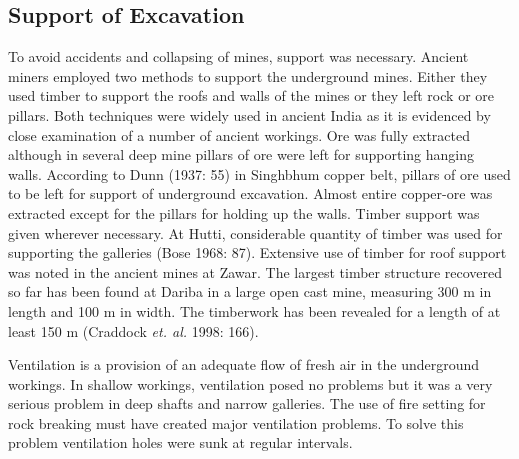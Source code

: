 \vspace{-.3cm}

\subsection*{Support of Excavation}

\vspace{-.2cm}

To avoid accidents and collapsing of mines, support was necessary. Ancient miners employed two methods to support the underground mines. Either they used timber to support the roofs and walls of the mines or they left rock or ore pillars. Both techniques were widely used in ancient India as it is evidenced by close examination of a number of ancient workings.  Ore was fully extracted although in several deep mine pillars of ore were left for supporting hanging walls. According to Dunn (1937: 55) in Singhbhum copper belt, pillars of ore used to be left for support of underground excavation. Almost entire copper-ore was extracted except for the pillars for holding up the walls. Timber support was given wherever necessary.  At Hutti, considerable quantity of timber was used for supporting the galleries (Bose 1968: 87).  Extensive use of timber for roof support was noted in the ancient mines at Zawar. The largest timber structure recovered so far has been found at Dariba in a large open cast mine, measuring 300 m in length and 100 m in width. The timberwork has been revealed for a length of at least 150 m (Craddock {\it et. al.} 1998: 166). 


Ventilation is a provision of an adequate flow of fresh air in the underground workings. In shallow workings, ventilation posed no problems but it was a very serious problem in deep shafts and narrow galleries. The use of fire setting for rock breaking must have created major ventilation problems. To solve this problem ventilation holes were sunk at regular intervals.

